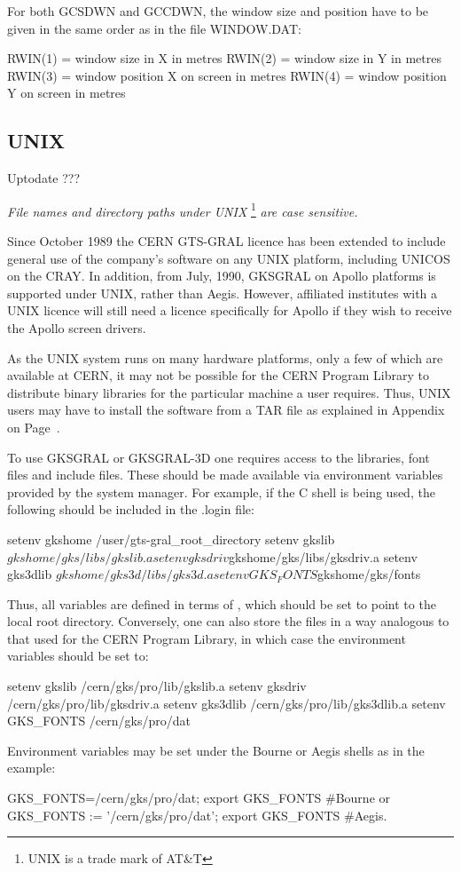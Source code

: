 For both GCSDWN and GCCDWN, the window size and position have to be given in
the same order as in the file WINDOW.DAT:
\begin{XMP}
RWIN(1) = window size in X in metres
RWIN(2) = window size in Y in metres
RWIN(3) = window position X on screen in metres
RWIN(4) = window position Y on screen in metres
\end{XMP}
\subsection{\protect\label{sec:unixlib}UNIX}
\Lit{$==>$} Uptodate ???
\begin{note}
{\it File names and directory paths under UNIX}
\footnote{UNIX is a trade mark of AT\&T}
{\it are case sensitive.}
\end{note}
 
Since October 1989 the CERN GTS-GRAL licence has been extended to include
general use of the company's software on any UNIX platform, including
UNICOS on the CRAY. In addition, from July, 1990, GKSGRAL on Apollo
platforms is supported under UNIX, rather than Aegis. However, affiliated
institutes with a UNIX licence will still need a licence specifically for
Apollo if they wish to receive the Apollo screen drivers.
 
As the UNIX system runs on many hardware platforms, only a few of which
are available at CERN, it may not be possible for the CERN Program Library
to distribute binary libraries for the particular machine a user requires.
Thus, UNIX users may have to install the software from
a TAR file as explained in Appendix on Page~\pageref{sec:unixdis}.
 
To use GKSGRAL or GKSGRAL-3D one requires access
to the libraries, font files and include files.
These should be made available via environment variables provided
by the system manager. For example, if the C shell is being used,
the following should be included in the .login file:
\begin{XMP}
setenv gkshome   /user/gts-gral_root_directory
setenv gkslib    $gkshome/gks/libs/gkslib.a
setenv gksdriv   $gkshome/gks/libs/gksdriv.a
setenv gks3dlib  $gkshome/gks3d/libs/gks3d.a
setenv GKS_FONTS $gkshome/gks/fonts
\end{XMP}
Thus, all variables are defined in terms of , which should
be set to point to the local root directory.
Conversely, one can also store the files in a way analogous
to that used for the CERN Program Library, in which case the
environment variables should be set to:
\begin{XMP}
setenv gkslib    /cern/gks/pro/lib/gkslib.a
setenv gksdriv   /cern/gks/pro/lib/gksdriv.a
setenv gks3dlib  /cern/gks/pro/lib/gks3dlib.a
setenv GKS_FONTS /cern/gks/pro/dat
\end{XMP}
Environment variables may be set under the Bourne or Aegis shells
as in the example:
\begin{XMP}
GKS_FONTS=/cern/gks/pro/dat; export GKS_FONTS      #Bourne
                  or
GKS_FONTS := '/cern/gks/pro/dat'; export GKS_FONTS #Aegis.
\end{XMP}
 
